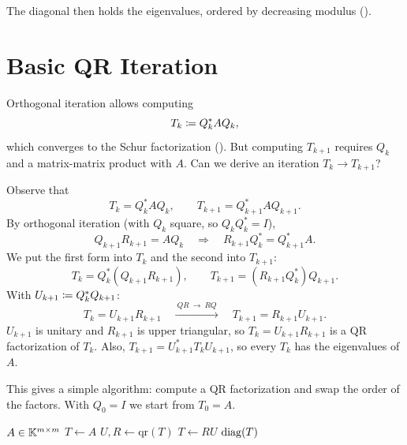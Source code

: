 The diagonal then holds the eigenvalues, ordered by decreasing modulus ().

\section{Basic QR Iteration}
\label{sec:basic-qr}

Orthogonal iteration allows computing
\begin{equation}
  T_k \coloneqq Q_k^\ast AQ_k,
\end{equation}
which converges to the Schur factorization (). But computing $T_{k+1}$ requires $Q_k$ and a matrix-matrix product with $A$. Can we derive an iteration $T_k \to T_{k+1}$?

Observe that
\begin{equation}
  T_k = Q_k^\ast AQ_k, \qquad T_{k+1} = Q_{k+1}^\ast AQ_{k+1}.
\end{equation}
By orthogonal iteration (with $Q_k$ square, so $Q_kQ_k^\ast = I$),
\begin{equation}
  Q_{k+1}R_{k+1} = AQ_k \quad\Longrightarrow\quad R_{k+1}Q_k^\ast = Q_{k+1}^\ast A.
\end{equation}
We put the first form into $T_k$ and the second into $T_{k+1}$:
\begin{equation}
  T_k = Q_k^\ast(Q_{k+1}R_{k+1}), \qquad T_{k+1} = (R_{k+1}Q_k^\ast)Q_{k+1}.
  \label{eq:qr-iter-derivation}
\end{equation}
With $U_{k+1} \coloneqq Q_k^\ast Q_{k+1}$:
\begin{equation}
  T_k = U_{k+1}R_{k+1} \quad\xrightarrow{\ QR\ \to\ RQ\ }\quad T_{k+1} = R_{k+1}U_{k+1}.
  \label{eq:qr-iter-UR}
\end{equation}
$U_{k+1}$ is unitary and $R_{k+1}$ is upper triangular, so $T_k = U_{k+1}R_{k+1}$ is a QR factorization of $T_k$. Also, $T_{k+1} = U_{k+1}^\ast T_kU_{k+1}$, so every $T_k$ has the eigenvalues of $A$.

This gives a simple algorithm: compute a QR factorization and swap the order of the factors. With $Q_0 = I$ we start from $T_0 = A$.

\begin{algorithm}[H]
  \caption{Basic QR iteration (QR algorithm without shifts).}
  \label{alg:basic-qr}
  \begin{algorithmic}[1]
    \Require $A \in \mathbb{K}^{m \times m}$
    \State $T \gets A$
      \State $U, R \gets \mathrm{qr}(T)$
      \State $T \gets RU$
    \EndFor
    \State \Return $\operatorname{diag}(T)$ 
  \end{algorithmic}
\end{algorithm}

